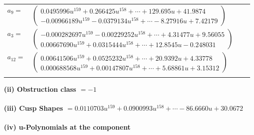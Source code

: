 \documentclass[1p]{elsarticle_modified}
\theoremstyle{definition}
\begin{document}
\begin{tabular}{m{7pt} m{180pt} m{7pt} m{180pt} }
\flushright $a_{9}=$&$\begin{pmatrix}0.0495996 u^{159}+0.266425 u^{158}+\cdots+129.695 u+41.9874\\-0.00966189 u^{159}-0.0379134 u^{158}+\cdots-8.27916 u+7.42179\end{pmatrix}$ \\
\flushright $a_{3}=$&$\begin{pmatrix}-0.000282697 u^{159}-0.00229252 u^{158}+\cdots+4.31477 u+9.56055\\0.00667690 u^{159}+0.0315444 u^{158}+\cdots+12.8545 u-0.248031\end{pmatrix}$ \\
\flushright $a_{12}=$&$\begin{pmatrix}0.00641506 u^{159}+0.0525232 u^{158}+\cdots+20.9392 u+4.33778\\0.000688568 u^{159}+0.00147807 u^{158}+\cdots+5.68861 u+3.15312\end{pmatrix}$\\&\end{tabular}
\flushleft \textbf{(ii) Obstruction class $= -1$}\\~\\
\flushleft \textbf{(iii) Cusp Shapes $= 0.0110703 u^{159}+0.0900993 u^{158}+\cdots-86.6660 u+30.0672$}\\~\\
\newpage\renewcommand{\arraystretch}{1}
\flushleft \textbf{(iv) u-Polynomials at the component}\newline \\
\end{document}
